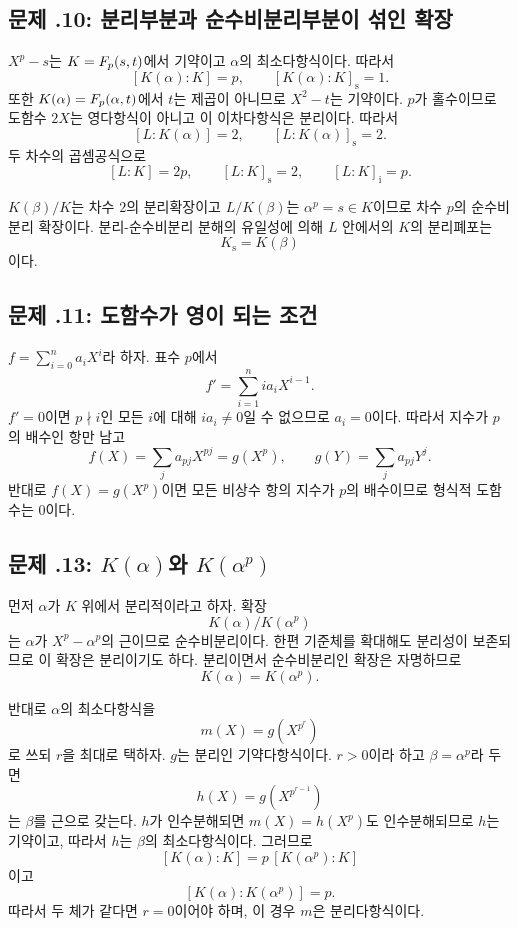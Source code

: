 \subsection*{문제 \thechapter.10: 분리부분과 순수비분리부분이 섞인 확장}

\begin{solution}
$X^p-s$는 $K=F_p(s,t)$에서 기약이고 $\alpha$의 최소다항식이다. 따라서
\[
  [K(\alpha):K]=p,
  \qquad
  [K(\alpha):K]_{\mathrm s}=1.
\]
또한 $K(\alpha)=F_p(\alpha,t)$에서 $t$는 제곱이 아니므로 $X^2-t$는 기약이다. $p$가 홀수이므로 도함수 $2X$는 영다항식이 아니고 이 이차다항식은 분리이다. 따라서
\[
  [L:K(\alpha)]=2,
  \qquad
  [L:K(\alpha)]_{\mathrm s}=2.
\]
두 차수의 곱셈공식으로
\[
  [L:K]=2p,
  \qquad
  [L:K]_{\mathrm s}=2,
  \qquad
  [L:K]_{\mathrm i}=p.
\]

$K(\beta)/K$는 차수 $2$의 분리확장이고 $L/K(\beta)$는 $\alpha^p=s\in K$이므로 차수 $p$의 순수비분리 확장이다. 분리-순수비분리 분해의 유일성에 의해 $L$ 안에서의 $K$의 분리폐포는
\[
  K_{\mathrm s}=K(\beta)
\]
이다.
\end{solution}

\subsection*{문제 \thechapter.11: 도함수가 영이 되는 조건}

\begin{solution}
$f=\sum_{i=0}^n a_iX^i$라 하자. 표수 $p$에서
\[
  f'=\sum_{i=1}^n i a_iX^{i-1}.
\]
$f'=0$이면 $p\nmid i$인 모든 $i$에 대해 $ia_i\ne0$일 수 없으므로 $a_i=0$이다. 따라서 지수가 $p$의 배수인 항만 남고
\[
  f(X)=\sum_j a_{pj}X^{pj}
  =g(X^p),
  \qquad
  g(Y)=\sum_j a_{pj}Y^j.
\]
반대로 $f(X)=g(X^p)$이면 모든 비상수 항의 지수가 $p$의 배수이므로 형식적 도함수는 $0$이다.
\end{solution}

\subsection*{문제 \thechapter.13: $K(\alpha)$와 $K(\alpha^p)$}

\begin{solution}
먼저 $\alpha$가 $K$ 위에서 분리적이라고 하자. 확장
\[
  K(\alpha)/K(\alpha^p)
\]
는 $\alpha$가 $X^p-\alpha^p$의 근이므로 순수비분리이다. 한편 기준체를 확대해도 분리성이 보존되므로 이 확장은 분리이기도 하다. 분리이면서 순수비분리인 확장은 자명하므로
\[
  K(\alpha)=K(\alpha^p).
\]

반대로 $\alpha$의 최소다항식을
\[
  m(X)=g(X^{p^r})
\]
로 쓰되 $r$을 최대로 택하자. $g$는 분리인 기약다항식이다. $r>0$이라 하고 $\beta=\alpha^p$라 두면
\[
  h(X)=g(X^{p^{r-1}})
\]
는 $\beta$를 근으로 갖는다. $h$가 인수분해되면 $m(X)=h(X^p)$도 인수분해되므로 $h$는 기약이고, 따라서 $h$는 $\beta$의 최소다항식이다. 그러므로
\[
  [K(\alpha):K]=p\,[K(\alpha^p):K]
\]
이고
\[
  [K(\alpha):K(\alpha^p)]=p.
\]
따라서 두 체가 같다면 $r=0$이어야 하며, 이 경우 $m$은 분리다항식이다.
\end{solution}
